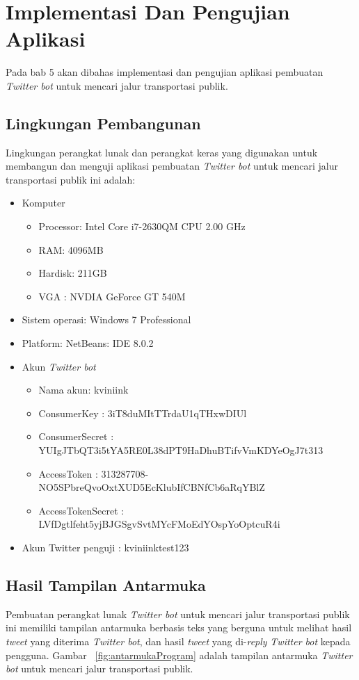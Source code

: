 \chapter{Implementasi Dan Pengujian Aplikasi}
\label{chap:implementasi dan pengujian aplikasi}

Pada bab 5 akan dibahas implementasi dan pengujian aplikasi pembuatan \textit{Twitter bot} untuk mencari jalur transportasi publik.

\section{Lingkungan Pembangunan}
Lingkungan perangkat lunak dan perangkat keras yang digunakan untuk membangun dan menguji aplikasi pembuatan \textit{Twitter bot} untuk mencari jalur transportasi publik ini adalah:
\begin{itemize}
	\item Komputer
	
	
	\begin{itemize}
		\item Processor: Intel Core i7-2630QM CPU 2.00 GHz
		\item RAM: 4096MB
		\item Hardisk: 211GB
		\item VGA : NVDIA GeForce GT 540M
	\end{itemize}
	\item Sistem operasi: Windows 7 Professional
	\item Platform: NetBeans: IDE 8.0.2
	
	\item Akun \textit{Twitter bot}
	\begin{itemize}
		\item Nama akun: kviniink
		\item ConsumerKey : 3iT8duMItTTrdaU1qTHxwDIUl
		\item ConsumerSecret : YUIgJTbQT3i5tYA5RE0L38dPT9HaDhuBTifvVmKDYeOgJ7t313
		\item AccessToken : 313287708-NO5SPbreQvoOxtXUD5EcKlubIfCBNfCb6aRqYBlZ
		\item AccessTokenSecret : LVfDgtlfeht5yjBJGSgvSvtMYcFMoEdYOspYoOptcuR4i
	\end{itemize}
	
	\item Akun Twitter penguji : kviniinktest123
\end{itemize}


\section{Hasil Tampilan Antarmuka}
Pembuatan perangkat lunak \textit{Twitter bot} untuk mencari jalur transportasi publik ini memiliki tampilan antarmuka berbasis teks yang berguna untuk melihat hasil \textit{tweet} yang diterima \textit{Twitter bot}, dan hasil \textit{tweet} yang di-\textit{reply} \textit{Twitter bot} kepada pengguna. Gambar ~\ref{fig:antarmukaProgram} adalah tampilan antarmuka \textit{Twitter bot} untuk mencari jalur transportasi publik.

